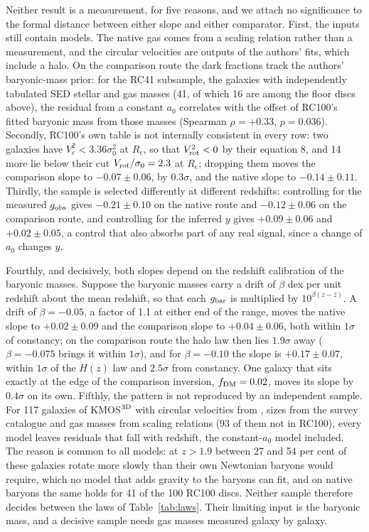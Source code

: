 \documentclass[fleqn,usenatbib]{mnras}
\begin{document}
Neither result is a measurement, for five reasons, and we attach no significance to the formal distance between either slope and either comparator. First, the inputs still contain models. The native gas comes from a scaling relation rather than a measurement, and the circular velocities are outputs of the authors' fits, which include a halo. On the comparison route the dark fractions track the authors' baryonic-mass prior: for the RC41 subsample, the galaxies with independently tabulated SED stellar and gas masses \citep{Price2021} (41, of which 16 are among the floor discs above), the residual from a constant $a_0$ correlates with the offset of RC100's fitted baryonic mass from those masses (Spearman $\rho=+0.33$, $p=0.036$). Secondly, RC100's own table is not internally consistent in every row: two galaxies have $V_c^2<3.36\sigma_0^2$ at $R_e$, so that $V_{\rm rot}^2<0$ by their equation 8, and 14 more lie below their cut $V_{\rm rot}/\sigma_0=2.3$ at $R_e$; dropping them moves the comparison slope to $-0.07\pm0.06$, by $0.3\sigma$, and the native slope to $-0.14\pm0.11$. Thirdly, the sample is selected differently at different redshifts: controlling for the measured $g_{\rm obs}$ gives $-0.21\pm0.10$ on the native route and $-0.12\pm0.06$ on the comparison route, and controlling for the inferred $y$ gives $+0.09\pm0.06$ and $+0.02\pm0.05$, a control that also absorbs part of any real signal, since a change of $a_0$ changes $y$.

Fourthly, and decisively, both slopes depend on the redshift calibration of the baryonic masses. Suppose the baryonic masses carry a drift of $\beta$ dex per unit redshift about the mean redshift, so that each $g_{\rm bar}$ is multiplied by $10^{\beta(z-\bar z)}$. A drift of $\beta=-0.05$, a factor of 1.1 at either end of the range, moves the native slope to $+0.02\pm0.09$ and the comparison slope to $+0.04\pm0.06$, both within $1\sigma$ of constancy; on the comparison route the halo law then lies $1.9\sigma$ away ($\beta=-0.075$ brings it within $1\sigma$), and for $\beta=-0.10$ the slope is $+0.17\pm0.07$, within $1\sigma$ of the $H(z)$ law and $2.5\sigma$ from constancy. One galaxy that sits exactly at the edge of the comparison inversion, $f_{\rm DM}=0.02$, moves its slope by $0.4\sigma$ on its own. Fifthly, the pattern is not reproduced by an independent sample. For 117 galaxies of KMOS$^{\rm 3D}$ with circular velocities from \citet{Ubler2017}, sizes from the survey catalogue \citep{Wisnioski2019} and gas masses from scaling relations (93 of them not in RC100), every model leaves residuals that fall with redshift, the constant-$a_0$ model included. The reason is common to all models: at $z>1.9$ between 27 and 54 per cent of these galaxies rotate more slowly than their own Newtonian baryons would require, which no model that adds gravity to the baryons can fit, and on native baryons the same holds for 41 of the 100 RC100 discs. Neither sample therefore decides between the laws of Table~\ref{tab:laws}. Their limiting input is the baryonic mass, and a decisive sample needs gas masses measured galaxy by galaxy.
\end{document}
